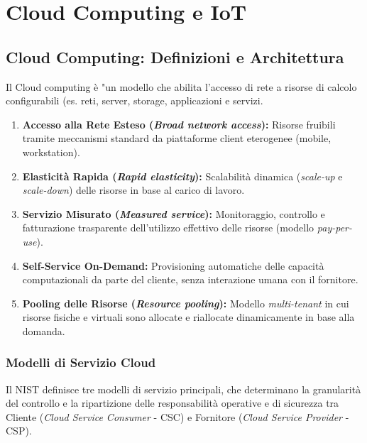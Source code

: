 \chapter{Cloud Computing e IoT}

\section{Cloud Computing: Definizioni e Architettura}
\begin{defbox}
Il Cloud computing è "un modello che abilita l'accesso di rete a risorse di calcolo configurabili (es. reti, server, storage, applicazioni e servizi.
\end{defbox}

\begin{notebox}
\begin{enumerate}
    \item \textbf{Accesso alla Rete Esteso (\textit{Broad network access}):} Risorse fruibili tramite meccanismi standard da piattaforme client eterogenee (mobile, workstation).
    \item \textbf{Elasticità Rapida (\textit{Rapid elasticity}):} Scalabilità dinamica (\textit{scale-up} e \textit{scale-down}) delle risorse in base al carico di lavoro.
    \item \textbf{Servizio Misurato (\textit{Measured service}):} Monitoraggio, controllo e fatturazione trasparente dell'utilizzo effettivo delle risorse (modello \textit{pay-per-use}).
    \item \textbf{Self-Service On-Demand:} Provisioning automatiche delle capacità computazionali da parte del cliente, senza interazione umana con il fornitore.
    \item \textbf{Pooling delle Risorse (\textit{Resource pooling}):} Modello \textit{multi-tenant} in cui risorse fisiche e virtuali sono allocate e riallocate dinamicamente in base alla domanda.
\end{enumerate}
\end{notebox}

\subsection{Modelli di Servizio Cloud}
Il NIST definisce tre modelli di servizio principali, che determinano la granularità del controllo e la ripartizione delle responsabilità operative e di sicurezza tra Cliente (\textit{Cloud Service Consumer} - CSC) e Fornitore (\textit{Cloud Service Provider} - CSP).

